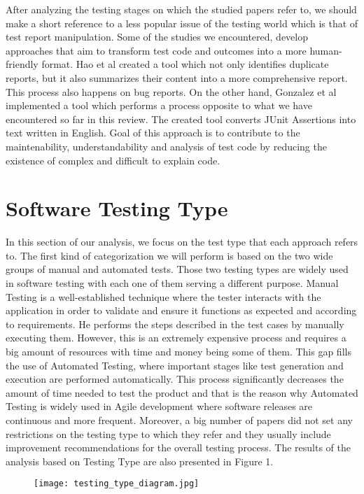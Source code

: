 After analyzing the testing stages on which the studied papers refer to, we should make a short reference to a less popular issue of the testing world which is that of test report manipulation. Some of the studies 
we encountered, develop approaches that aim to transform test code and outcomes into a more human-friendly format. Hao et al \cite{8811987} created a tool which not only identifies duplicate reports, but it also 
summarizes their content into a more comprehensive report. This process also happens on bug reports. On the other hand, Gonzalez et al \cite{10.1145/3283812.3283819} implemented a tool which performs a process 
opposite to what we have encountered so far in this review. The created tool converts JUnit Assertions into text written in English. Goal of this approach is to contribute to the maintenability, understandability 
and analysis of test code by reducing the existence of complex and difficult to explain code.

\section {Software Testing Type}
In this section of our analysis, we focus on the test type that each approach refers to. The first kind of categorization we will perform is based on the two wide groups of manual and automated tests. 
Those two testing types are widely used in software testing with each one of them serving a different purpose. Manual Testing is a well-established technique where the tester interacts with the 
application in order to validate and ensure it functions as expected and according to requirements. He performs the steps described in the test cases by manually executing them. However, this is an 
extremely expensive process and requires a big amount of resources with time and money being some of them. This gap fills the use of Automated Testing, where important stages like test generation and execution 
are performed automatically. This process significantly decreases the amount of time needed to test the product and that is the reason why Automated Testing is widely used in Agile development where 
software releases are continuous and more frequent. Moreover, a big number of papers did not set any restrictions on the testing type to which they refer and they usually include improvement recommendations for 
the overall testing process. The results of the analysis based on Testing Type are also presented in Figure 1.\\

\begin{figure}[h]
    \texttt{[image: testing\_type\_diagram.jpg]}
    \centering
\end{figure}

